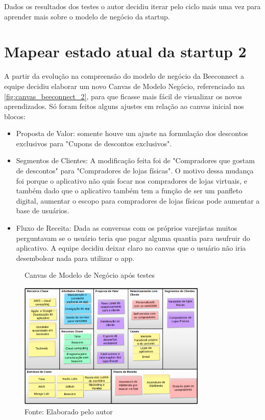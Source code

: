 Dados os resultados dos testes o autor decidiu iterar pelo ciclo mais uma vez para aprender mais sobre o modelo de negócio da startup.

\section{Mapear estado atual da startup 2}
\label{cha:mapear_estado_2}
A partir da evolução na compreensão do modelo de negócio da Beeconnect a equipe decidiu elaborar um novo Canvas de Modelo Negócio, referenciado na \autoref{fig:canvas_beeconnect_2}, para que ficasse mais fácil de visualizar os novos aprendizados. Só foram feitos alguns ajustes em relação ao canvas inicial nos blocos:

\begin{itemize}
\item Proposta de Valor: somente houve um ajuste na formulação dos descontos exclusivos para "Cupons de descontos exclusivos".
\item Segmentos de Clientes: A modificação feita foi de "Compradores que gostam de descontos" para "Compradores de lojas físicas". O motivo dessa mudança foi porque o aplicativo não quis focar nos compradores de lojas virtuais, e também dado que o aplicativo também tem a função de ser um panfleto digital, aumentar o escopo para compradores de lojas físicas pode aumentar a base de usuários.
\item Fluxo de Receita: Dada as conversas com os próprios varejistas muitos perguntavam se o usuário teria que pagar alguma quantia para usufruir do aplicativo. A equipe decidiu deixar claro no canvas que o usuário não iria desembolsar nada para utilizar o app.
\end{itemize}

\begin{figure}[H]
\caption{Canvas de Modelo de Negócio após testes}
\centerline{\includegraphics[width=0.8\textwidth]{img/canvas_beeconnect_2}}
\label{fig:canvas_beeconnect_2}
\caption* {Fonte: Elaborado pelo autor}
\end{figure}

